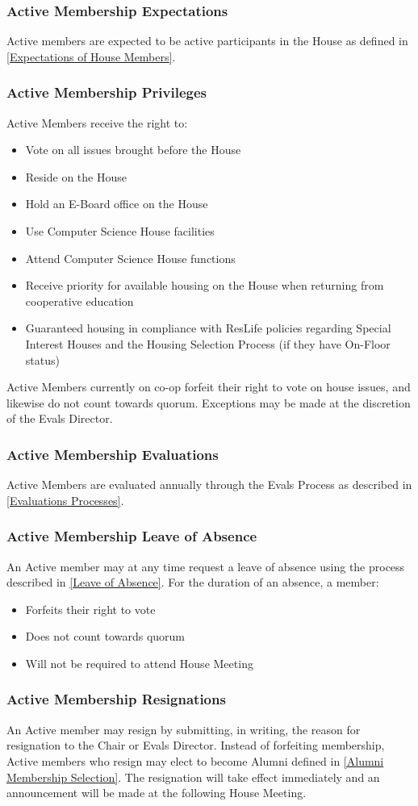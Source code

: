 \documentclass{article}
\newcommand{\asubsection}[1]{\subsubsection{#1} \label{#1}}
\begin{document}
\asubsection{Active Membership Expectations}
Active members are expected to be active participants in the House as defined in \ref{Expectations of House Members}.

\asubsection{Active Membership Privileges}
Active Members receive the right to:
\begin{itemize}
	\item Vote on all issues brought before the House
	\item Reside on the House
	\item Hold an E-Board office on the House
	\item Use Computer Science House facilities
	\item Attend Computer Science House functions
	\item Receive priority for available housing on the House when returning from cooperative education
	\item Guaranteed housing in compliance with ResLife policies regarding Special Interest Houses and the Housing Selection Process (if they have On-Floor status)
\end{itemize}
Active Members currently on co-op forfeit their right to vote on house issues, and likewise do not count towards quorum.
Exceptions may be made at the discretion of the Evals Director.

\asubsection{Active Membership Evaluations}
Active Members are evaluated annually through the Evals Process as described in \ref{Evaluations Processes}.

\asubsection{Active Membership Leave of Absence}
An Active member may at any time request a leave of absence using the process described in \ref{Leave of Absence}.
For the duration of an absence, a member:
\begin{itemize}
	\item Forfeits their right to vote
	\item Does not count towards quorum
	\item Will not be required to attend House Meeting
\end{itemize}

\asubsection{Active Membership Resignations}
An Active member may resign by submitting, in writing, the reason for resignation to the Chair or Evals Director.
Instead of forfeiting membership, Active members who resign may elect to become Alumni defined in \ref{Alumni Membership Selection}.
The resignation will take effect immediately and an announcement will be made at the following House Meeting.
\end{document}
